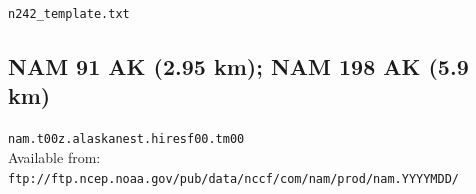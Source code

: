 \documentclass[11pt]{article}   %
\begin{document}
\verb|n242_template.txt| \\
\tiny  \normalsize

\clearpage
\subsection{NAM 91 AK (2.95 km); NAM 198 AK (5.9 km)}

\verb|nam.t00z.alaskanest.hiresf00.tm00|\\
Available from:\\
\verb|ftp://ftp.ncep.noaa.gov/pub/data/nccf/com/nam/prod/nam.YYYYMDD/| \\
\end{document}

